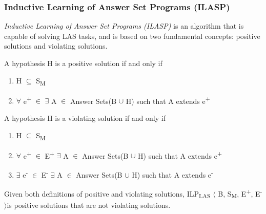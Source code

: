 \documentclass[12pt,twoside]{report}
\newtheorem{examp}{example}[section]
\begin{document}

%
%


\subsubsection{Inductive Learning of Answer Set Programs (ILASP)}

\textit{Inductive Learning of Answer Set Programs (ILASP)} is an algorithm that is capable of solving LAS tasks, and is based on two fundamental concepts: positive solutions and violating solutions. 

A hypothesis H is a positive solution if and only if
\begin{enumerate}
\item H $\subseteq$ S\textsubscript{M}
\item $\forall$ e\textsuperscript{+} $\in$ $\exists$ A $\in$ Answer Sets(B $\cup$ H) such that A extends e\textsuperscript{+}
\end{enumerate}
A hypothesis H is a violating solution if and only if
\begin{enumerate}
\item H $\subseteq$ S\textsubscript{M}
\item $\forall$ e\textsuperscript{+} $\in$ E\textsuperscript{+} $\exists$ A $\in$ Answer Sets(B $\cup$ H) such that A extends e\textsuperscript{+}
\item $\exists$ e\textsuperscript{-} $\in$ E\textsuperscript{-} $\exists$ A $\in$ Answer Sets(B $\cup$ H) such that A extends e\textsuperscript{-}\\
\end{enumerate}

Given both definitions of positive and violating solutions, ILP\textsubscript{LAS} $\langle$ B, S\textsubscript{M}, E\textsuperscript{+}, E\textsuperscript{-} $\rangle$is positive solutions that are not violating solutions.
\end{document}
